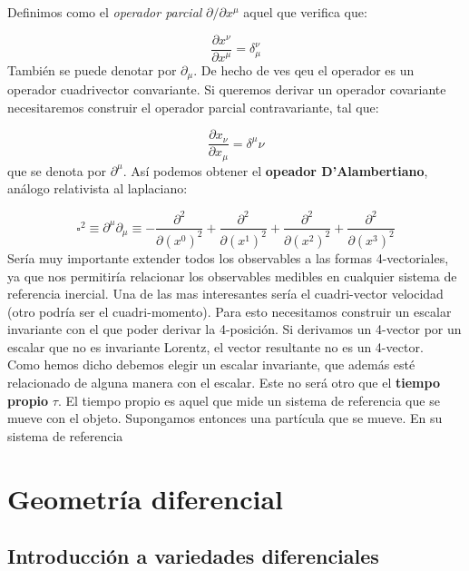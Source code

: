 \documentclass[12pt,a4paper]{book}
\numberwithin{equation}{section}
\numberwithin{figure}{section}
\newcommand{\parciales}[2]{\frac{\partial #1}{\partial #2}}
\begin{document}
Definimos como el \textit{operador parcial} $\partial / \partial x^{\mu}$ aquel que verifica que:

\begin{equation}
\parciales{x^{\nu}}{x^{\mu}} = \delta_{\mu}^{\nu}
\end{equation}
También se puede denotar por $\partial_\mu$. De hecho de ves qeu el operador es un operador cuadrivector convariante. Si queremos derivar un operador covariante necesitaremos construir el operador parcial contravariante, tal que:

\begin{equation}
\parciales{x_{\nu}}{x_{\mu}} = \delta^{\mu}{\nu}
\end{equation}
que se denota por $\partial^{\mu}$. Así podemos obtener el \textbf{opeador D'Alambertiano}, análogo relativista al laplaciano:

\begin{equation}
\square^2 \equiv \partial^\mu \partial_\mu \equiv - \parciales{^2}{(x^0)^2} + \parciales{^2}{(x^1)^2} + \parciales{^2}{(x^2)^2}  + \parciales{^2}{(x^3)^2} 
\end{equation}
Sería muy importante extender todos los observables a las formas 4-vectoriales, ya que nos permitiría relacionar los observables medibles en cualquier sistema de referencia inercial. Una de las mas interesantes sería el cuadri-vector velocidad (otro podría ser el cuadri-momento). Para esto necesitamos construir un escalar invariante con el que poder derivar la 4-posición. Si derivamos un 4-vector por un escalar que no es invariante Lorentz, el vector resultante no es un 4-vector. \\

Como hemos dicho debemos elegir un escalar invariante, que además esté relacionado de alguna manera con el escalar. Este no será otro que el \textbf{tiempo propio} $\tau$. El tiempo propio es aquel que mide un sistema de referencia que se mueve con el objeto. Supongamos entonces una partícula que se mueve. En su sistema de referencia

\newpage

\chapter{Geometría diferencial}

\section{Introducción a variedades diferenciales}
\end{document}
